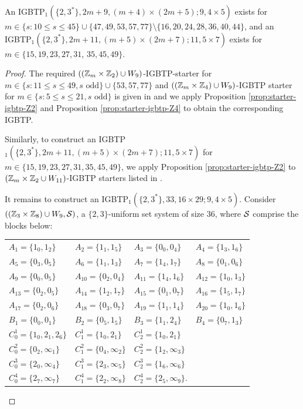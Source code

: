 \documentclass[draft, 11pt]{article}
\begin{document}
 \begin{corollary}
 \label{cor:small-igbtp}
An IGBTP$_1(\{2,3^*\},2m+9,(m+4)\times (2m+5); 9,4\times 5)$ exists
 for $m\in \{s: 10\le s\le 45\}\cup\{47,49,53,57,77\}\setminus\{16,20,24,28,36,40,44\}$, 
and an IGBTP$_1(\{2,3^*\},2m+11,(m+5)\times (2m+7); 11,5\times 7)$ exists
 for $m\in \{15,19,23,27,31$, $35,45,49\} $.




 \end{corollary}
 \begin{proof}
The required $((\mathbb Z_m\times \mathbb Z_2)\cup W_9)$-IGBTP-starter for $m\in \{s: 11\leq s\leq 49, s\mbox{ odd}\} \cup \{53,57,77\}$
and $((\mathbb Z_m\times \mathbb Z_4)\cup W_9)$-IGBTP starter for $m\in \{s:5\le s\le 21, s\mbox{ odd}\}$ is given in \cite{Cheeetal:2012online} and 
 we apply Proposition \ref{prop:starter-igbtp-Z2} and Proposition \ref{prop:starter-igbtp-Z4} to obtain the corresponding IGBTP.
 
 Similarly, to construct an IGBTP$_1(\{2,3^*\},2m+11,(m+5)\times (2m+7); 11,5\times 7)$ for $m\in \{15,19,23,27,31,35,45,49\} $, 
 we apply Proposition \ref{prop:starter-igbtp-Z2} to $(\mathbb Z_m\times \mathbb Z_2\cup W_{11})$-IGBTP starters listed in \cite{Cheeetal:2012online}.
 
 It remains to construct an IGBTP$_1(\{2,3^*\},33,16\times 29; 9,4\times 5)$. 
 Consider $((\mathbb Z_{3}\times\mathbb Z_8)\cup W_9,\mathcal S)$, a $\{2,3\}$-uniform set system of size $36$, 
 where
 $\mathcal S$ comprise the blocks below: 

\begin{center}
\renewcommand{\arraystretch}{1.1}
{\setlength{\tabcolsep}{3pt}
\begin{tabular}{llll}
$A_1=\{1_0,1_2\}$      &
$A_2=\{1_1,1_5\}$      &
$A_3=\{0_0,0_4\}$      &
$A_4=\{1_3,1_6\}$      \\
$A_5=\{0_3,0_5\}$      &
$A_6=\{1_1,1_3\}$      &
$A_7=\{1_4,1_7\}$      &
$A_8=\{0_1,0_6\}$      \\
$A_9=\{0_0,0_5\}$      &
$A_{10}=\{0_2,0_4\}$      &
$A_{11}=\{1_4,1_6\}$      &
$A_{12}=\{1_0,1_3\}$      \\
$A_{13}=\{0_2,0_5\}$      &
$A_{14}=\{1_2,1_7\}$      &
$A_{15}=\{0_1,0_7\}$      &
$A_{16}=\{1_5,1_7\}$      \\
$A_{17}=\{0_2,0_6\}$      &
$A_{18}=\{0_3,0_7\}$      &
$A_{19}=\{1_1,1_4\}$      &
$A_{20}=\{1_0,1_6\}$      \\
$B_1=\{0_0,0_1\}$      &
$B_2=\{0_5,1_5\}$      &
$B_3=\{1_1,2_4\}$      &
$B_4=\{0_7,1_3\}$      \\
$C^{1}_0=\{1_0,2_1, 2_6\}$      &
$C^{1}_1=\{1_0,2_1\}$      &
$C^{1}_2=\{1_0,2_1\}$      \\
$C^{2}_0=\{0_2,\infty_1\}$      &
$C^{2}_1=\{0_4,\infty_2\}$      &
$C^{2}_2=\{1_2,\infty_3\}$      \\
$C^{3}_0=\{2_0,\infty_4\}$      &
$C^{3}_1=\{2_3,\infty_5\}$      &
$C^{3}_2=\{1_6,\infty_6\}$      \\
$C^{4}_0=\{2_7,\infty_7\}$      &
$C^{4}_1=\{2_2,\infty_8\}$      &
$C^{4}_2=\{2_5,\infty_9\}$.      \\
\end{tabular}}
\end{center}



\end{proof}
\end{document}
